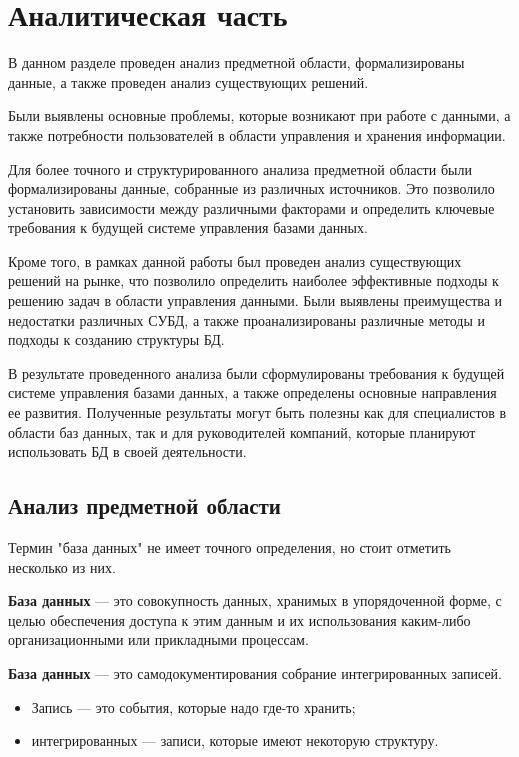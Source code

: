 \section{\large Аналитическая часть}

В данном разделе проведен анализ предметной области, формализированы данные,
а также проведен анализ существующих решений.

Были выявлены основные проблемы, которые возникают при работе с данными, а также потребности пользователей в области управления и хранения информации.

Для более точного и структурированного анализа предметной области были формализированы данные, собранные из различных источников. Это позволило установить зависимости между различными факторами и определить ключевые требования к будущей системе управления базами данных.

Кроме того, в рамках данной работы был проведен анализ существующих решений на рынке, что позволило определить наиболее эффективные подходы к решению задач в области управления данными. Были выявлены преимущества и недостатки различных СУБД, а также проанализированы различные методы и подходы к созданию структуры БД.

В результате проведенного анализа были сформулированы требования к будущей системе управления базами данных, а также определены основные направления ее развития. Полученные результаты могут быть полезны как для специалистов в области баз данных, так и для руководителей компаний, которые планируют использовать БД в своей деятельности.

\subsection{Анализ предметной области}

Термин "база данных" не имеет точного определения, но стоит отметить несколько из них.


\textbf{База данных} \cite{bd-1} --- это совокупность данных, хранимых в упорядоченной форме, с целью
обеспечения доступа к этим данным и их использования каким-либо организационными
или прикладными процессам.

\textbf{База данных} --- это самодокументирования собрание интегрированных записей.

\begin{itemize}
    \item Запись --- это события, которые надо где-то хранить;
    \item интегрированных --- записи, которые имеют некоторую структуру.
\end{itemize}


